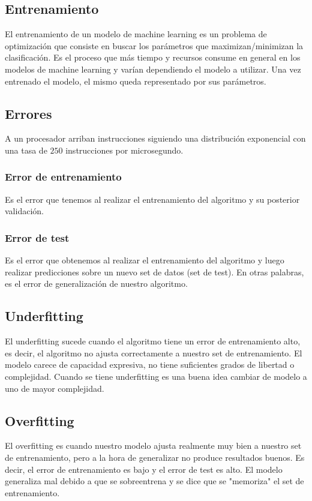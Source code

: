 \documentclass[12pt]{article}
\begin{document}
\subsection{Entrenamiento}
El entrenamiento de un modelo de machine learning es un problema de optimización que consiste en buscar los parámetros que maximizan/minimizan la clasificación.
Es el proceso que más tiempo y recursos consume en general en los modelos de machine learning y varían dependiendo el modelo a utilizar.
Una vez entrenado el modelo, el mismo queda representado por sus parámetros.


\subsection{Errores}
A un procesador arriban instrucciones siguiendo una distribución exponencial con una tasa de $250$ instrucciones por microsegundo.

\subsubsection{Error de entrenamiento}
Es el error que tenemos al realizar el entrenamiento del algoritmo y su posterior validación.

\subsubsection{Error de test}
Es el error que obtenemos al realizar el entrenamiento del algoritmo y luego realizar predicciones sobre un nuevo set de datos (set de test).
En otras palabras, es el error de generalización de nuestro algoritmo.


\subsection{Underfitting}
El underfitting sucede cuando el algoritmo tiene un error de entrenamiento alto, es decir, el algoritmo no ajusta correctamente a nuestro set de entrenamiento.
El modelo carece de capacidad expresiva, no tiene suficientes grados de libertad o complejidad.
Cuando se tiene underfitting es una buena idea cambiar de modelo a uno de mayor complejidad.


\subsection{Overfitting}
El overfitting es cuando nuestro modelo ajusta realmente muy bien a nuestro set de entrenamiento, pero a la hora de generalizar no produce resultados buenos. Es decir, el error de entrenamiento es bajo y el error de test es alto.
El modelo generaliza mal debido a que se sobreentrena y se dice que se "memoriza" el set de entrenamiento.
\end{document}
